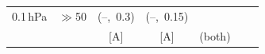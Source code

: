 \documentclass[12pt,twoside,english]{article}\usepackage[]{graphicx}\usepackage[]{color}
\providecommand{\tabularnewline}{\\}
\begin{document}
{{\begin{table}
\begin{tabular}{ccccccc}
0.1\,hPa  &
$\gg$50&
(--,~0.3)  &
(--,~0.15)\tabularnewline
&&[A]&[A]&(both)\tabularnewline
\bottomrule
\end{tabular}
\end{table}
% 


}}
\end{document}
